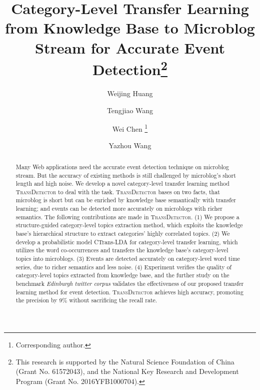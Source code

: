 \documentclass[runningheads,a4paper]{llncs}
\theoremstyle{exampstyle}
\begin{document}
%
\title{Category-Level Transfer Learning from Knowledge Base to Microblog Stream for Accurate Event Detection\thanks{This research is supported by the Natural Science Foundation of China (Grant No. 61572043), and the National Key Research and Development Program (Grant No. 2016YFB1000704).}}
\author{Weijing Huang \and Tengjiao Wang \and Wei Chen \thanks{Corresponding author.} \and Yazhou Wang }

\maketitle
%


\begin{abstract}
Many Web applications need the accurate event detection technique on microblog stream. 
But the accuracy of existing methods is still challenged by microblog's short length and high noise. 
We develop a novel category-level transfer learning method \textsc{TransDetector} to deal with the task.  
\textsc{TransDetector} bases on two facts, that microblog is short but can be enriched by knowledge base semantically with transfer learning; and events can be detected more accurately on microblogs with richer semantics.
The following contributions are made in \textsc{TransDetector}.
(1) We propose a structure-guided category-level topics extraction method, which exploits the knowledge base's hierarchical structure to extract categories' highly correlated topics. 
(2) We develop a probabilistic model CTrans-LDA for category-level transfer learning, which utilizes the word co-occurrences and transfers the knowledge base's category-level topics into microblogs. 
(3) Events are detected accurately on category-level word time series, due to richer semantics and less noise. 
(4) Experiment verifies the quality of category-level topics extracted from knowledge base, and the further study on the benchmark \textit{Edinburgh twitter corpus} validates the effectiveness of our proposed transfer learning method for event detection.
\textsc{TransDetector} achieves high accuracy, promoting the precision by 9\% without  sacrificing the recall rate.
\end{abstract}
\end{document}

